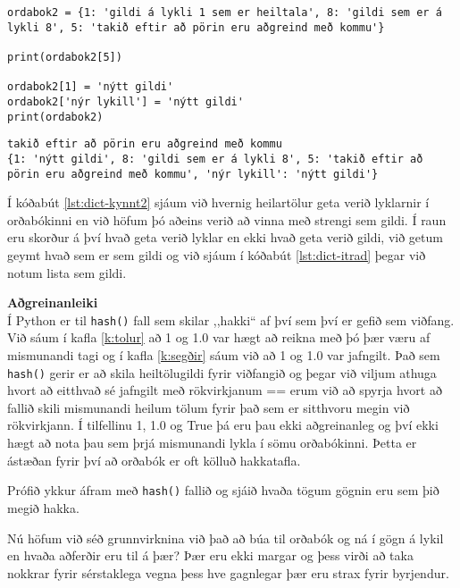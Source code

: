 \begin{lstlisting}[caption=Gögnum bætt við og þau tekin út, label=lst:dict-kynnt2]
ordabok2 = {1: 'gildi á lykli 1 sem er heiltala', 8: 'gildi sem er á lykli 8', 5: 'takið eftir að pörin eru aðgreind með kommu'}

print(ordabok2[5])

ordabok2[1] = 'nýtt gildi' 
ordabok2['nýr lykill'] = 'nýtt gildi'
print(ordabok2)
\end{lstlisting}
\lstset{style=uttak}
\begin{lstlisting}
takið eftir að pörin eru aðgreind með kommu
{1: 'nýtt gildi', 8: 'gildi sem er á lykli 8', 5: 'takið eftir að pörin eru aðgreind með kommu', 'nýr lykill': 'nýtt gildi'}
\end{lstlisting}
\lstset{style=venjulegt}

Í kóðabút \ref{lst:dict-kynnt2} sjáum við hvernig heilartölur geta verið lyklarnir í orðabókinni en við höfum þó aðeins verið að vinna með strengi sem gildi.
Í raun eru skorður á því hvað geta verið lyklar en ekki hvað geta verið gildi, við getum geymt hvað sem er sem gildi og við sjáum í kóðabút \ref{lst:dict-itrad} þegar við notum lista sem gildi.

\begin{itarefni}
\textbf{Aðgreinanleiki}\\
Í Python er til \texttt{hash()} fall sem skilar ,,hakki“ af því sem því er gefið sem viðfang.
Við sáum í kafla \ref{k:tolur} að 1 og 1.0 var hægt að reikna með þó þær væru af mismunandi tagi og í kafla \ref{k:segðir} sáum við að 1 og 1.0 var jafngilt.
Það sem \texttt{hash()} gerir er að skila heiltölugildi fyrir viðfangið og þegar við viljum athuga hvort að eitthvað sé jafngilt með rökvirkjanum == erum við að spyrja hvort að fallið skili mismunandi heilum tölum fyrir það sem er sitthvoru megin við rökvirkjann.
Í tilfellinu 1, 1.0 og True þá eru þau ekki aðgreinanleg og því ekki hægt að nota þau sem þrjá mismunandi lykla í sömu orðabókinni.
Þetta er ástæðan fyrir því að orðabók er oft kölluð hakkatafla.

Prófið ykkur áfram með \texttt{hash()} fallið og sjáið hvaða tögum gögnin eru sem þið megið hakka. 
\end{itarefni}

Nú höfum við séð grunnvirknina við það að búa til orðabók og ná í gögn á lykil en hvaða aðferðir eru til á þær?
Þær eru ekki margar og þess virði að taka nokkrar fyrir sérstaklega vegna þess hve gagnlegar þær eru strax fyrir byrjendur.

